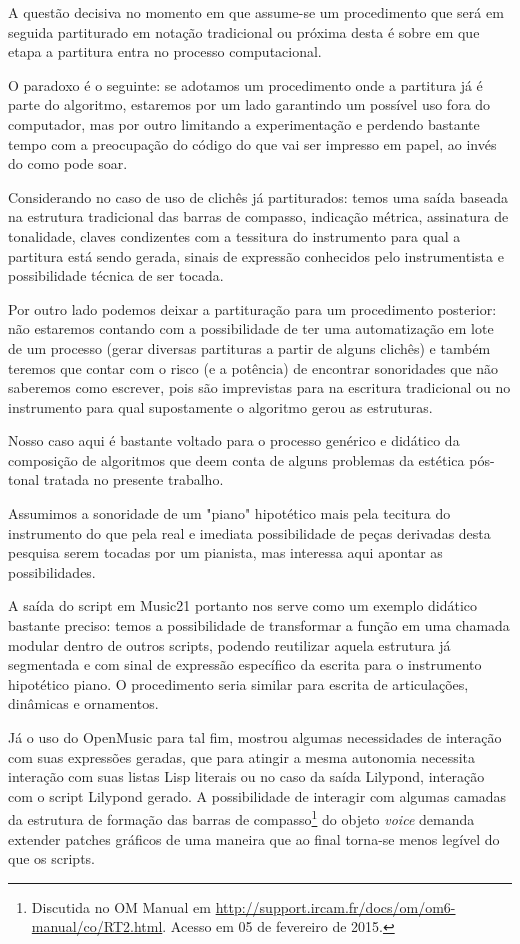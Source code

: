 \documentclass[
	12pt,				%
	openright,			%
	twoside,			%
	a4paper,			%
	english,			%
	french,				%
	spanish,			%
	brazil				%
	]{abntex2}
\begin{document}
A questão decisiva no momento em que assume-se um procedimento que será em seguida partiturado em notação tradicional ou próxima desta é sobre em que etapa a partitura entra no processo computacional. 

O paradoxo é o seguinte: se adotamos um procedimento onde a partitura já é parte do algoritmo, estaremos por um lado garantindo um possível uso fora do computador, mas por outro limitando a experimentação e perdendo bastante tempo com a preocupação do código do que vai ser impresso em papel, ao invés do como pode soar. 

Considerando no caso de uso de clichês já partiturados: temos uma saída baseada na estrutura tradicional das barras de compasso, indicação métrica, assinatura de tonalidade, claves condizentes com a tessitura do instrumento para qual a partitura está sendo gerada, sinais de expressão conhecidos pelo instrumentista e possibilidade técnica de ser tocada.

Por outro lado podemos deixar a partituração para um procedimento posterior: não estaremos contando com a possibilidade de ter uma automatização em lote de um processo (gerar diversas partituras a partir de alguns clichês) e também teremos que contar com o risco (e a potência) de encontrar sonoridades que não saberemos como escrever, pois são imprevistas para na escritura tradicional ou no instrumento para qual supostamente o algoritmo gerou as estruturas.

Nosso caso aqui é bastante voltado para o processo genérico e didático da composição de algoritmos que deem conta de alguns problemas da estética pós-tonal tratada no presente trabalho. 

Assumimos a sonoridade de um "piano" hipotético mais pela tecitura do instrumento do que pela real e imediata possibilidade de peças derivadas desta pesquisa serem tocadas por um pianista, mas interessa aqui apontar as possibilidades.

A saída do script em Music21 portanto nos serve como um exemplo didático bastante preciso: temos a possibilidade de transformar a função em uma chamada modular dentro de outros scripts, podendo reutilizar aquela estrutura já segmentada e com sinal de expressão específico da escrita para o instrumento hipotético piano. O procedimento seria similar para escrita de articulações, dinâmicas e ornamentos.

Já o uso do OpenMusic para tal fim, mostrou algumas necessidades de interação com suas expressões geradas, que para atingir a mesma autonomia necessita interação com suas listas Lisp literais ou no caso da saída Lilypond, interação com o script Lilypond gerado. A possibilidade de interagir com algumas camadas da estrutura de formação das barras de compasso\footnote{Discutida no OM Manual em \url{http://support.ircam.fr/docs/om/om6-manual/co/RT2.html}. Acesso em 05 de fevereiro de 2015.} do objeto \textit{voice} demanda extender patches gráficos de uma maneira que ao final torna-se menos legível do que os scripts.
\end{document}

